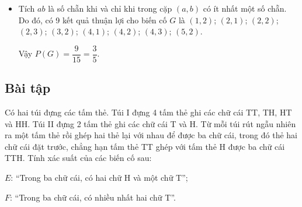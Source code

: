 \begin{exercises}
\begin{enumerate}[label=\alph*)]
\begin{itemize}
            \item Tích $ab$ là số chẵn khi và chỉ khi trong cặp $(a, b)$ có ít nhất một số chẵn.
            Do đó, có 9 kết quả thuận lợi cho biến cố $G$ là $(1, 2)$; $(2, 1)$; $(2, 2)$; $(2, 3)$; $(3, 2)$; $(4, 1)$;
            $(4, 2)$; $(4, 3)$; $(5, 2)$.

            Vậy $P(G)=\dfrac{9}{15}=\dfrac{3}{5}$.
        \end{itemize}
    \end{enumerate}

    \subsection{Bài tập}

    \begin{questions}[resume=SGK]
        \item Có hai túi đựng các tấm thẻ. Túi I đựng 4 tấm thẻ ghi
        các chữ cái TT, TH, HT và HH. Túi II đựng 2 tấm thẻ
        ghi các chữ cái T và H. Từ mỗi túi rút ngẫu nhiên ra
        một tấm thẻ rồi ghép hai thẻ lại với nhau để được ba
        chữ cái, trong đó thẻ hai chữ cái đặt trước, chẳng hạn
        tấm thẻ TT ghép với tấm thẻ H được ba chữ cái TTH.
        Tính xác suất của các biến cố sau:

        \begin{center}
        \end{center}

        \begin{questions}
            \item $E$: “Trong ba chữ cái, có hai chữ H và một chữ T”;

            \answerline
            \answerline

            \item $F$: “Trong ba chữ cái, có nhiều nhất hai chữ T”.

            \answerline
            \answerline
        \end{questions}


\end{questions}
\end{exercises}
